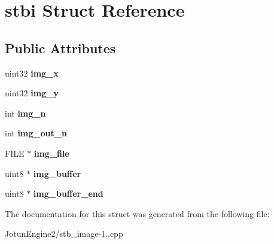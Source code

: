 \hypertarget{structstbi}{\section{stbi Struct Reference}
\label{structstbi}
}
\subsection*{Public Attributes}
\begin{DoxyCompactItemize}
\item 
\hypertarget{structstbi_af3b42c257fb0d8896f29ca3921540a42}{uint32 {\bfseries img\-\_\-x}}\label{structstbi_af3b42c257fb0d8896f29ca3921540a42}

\item 
\hypertarget{structstbi_a60cb5a630e268b2d12306c6eca246dd1}{uint32 {\bfseries img\-\_\-y}}\label{structstbi_a60cb5a630e268b2d12306c6eca246dd1}

\item 
\hypertarget{structstbi_ae22cfcc23f5ab67bede22942333ecbd7}{int {\bfseries img\-\_\-n}}\label{structstbi_ae22cfcc23f5ab67bede22942333ecbd7}

\item 
\hypertarget{structstbi_a33f6519d8f99b84afbde795dc7a931f2}{int {\bfseries img\-\_\-out\-\_\-n}}\label{structstbi_a33f6519d8f99b84afbde795dc7a931f2}

\item 
\hypertarget{structstbi_ae543edaa9f3668b09ef14bd6e882b1ec}{F\-I\-L\-E $\ast$ {\bfseries img\-\_\-file}}\label{structstbi_ae543edaa9f3668b09ef14bd6e882b1ec}

\item 
\hypertarget{structstbi_aace36d5487a596bea5faa0aef0398ac8}{uint8 $\ast$ {\bfseries img\-\_\-buffer}}\label{structstbi_aace36d5487a596bea5faa0aef0398ac8}

\item 
\hypertarget{structstbi_a55f78565e605f1784d47fc9acea475f3}{uint8 $\ast$ {\bfseries img\-\_\-buffer\-\_\-end}}\label{structstbi_a55f78565e605f1784d47fc9acea475f3}

\end{DoxyCompactItemize}


The documentation for this struct was generated from the following file\-:\begin{DoxyCompactItemize}
\item 
Jotun\-Engine2/stb\-\_\-image-\/1..\-cpp\end{DoxyCompactItemize}
